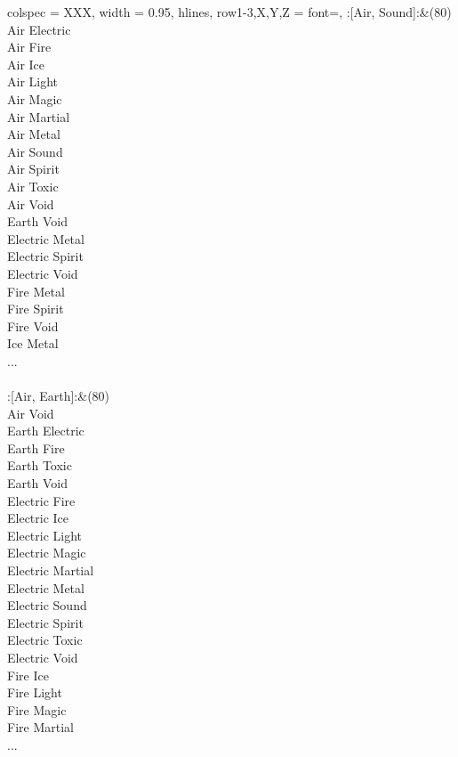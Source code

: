 \begin{longtblr}[
	caption = {2v2 Defending Weak},
	label = {2v2-Defending-Weak},
]{
	colspec = {XXX}, width = 0.95\linewidth,
	hlines,
	row{1-3,X,Y,Z} = {font=\bfseries},
}
	:[Air, Sound]:&{(80)\\
	Air Electric \\
	Air Fire \\
	Air Ice \\
	Air Light \\
	Air Magic \\
	Air Martial \\
	Air Metal \\
	Air Sound \\
	Air Spirit \\
	Air Toxic \\
	Air Void \\
	Earth Void \\
	Electric Metal \\
	Electric Spirit \\
	Electric Void \\
	Fire Metal \\
	Fire Spirit \\
	Fire Void \\
	Ice Metal \\
	...\\
	}\\

	:[Air, Earth]:&{(80)\\
	Air Void \\
	Earth Electric \\
	Earth Fire \\
	Earth Toxic \\
	Earth Void \\
	Electric Fire \\
	Electric Ice \\
	Electric Light \\
	Electric Magic \\
	Electric Martial \\
	Electric Metal \\
	Electric Sound \\
	Electric Spirit \\
	Electric Toxic \\
	Electric Void \\
	Fire Ice \\
	Fire Light \\
	Fire Magic \\
	Fire Martial \\
	...\\
	}\\


\end{longtblr}
